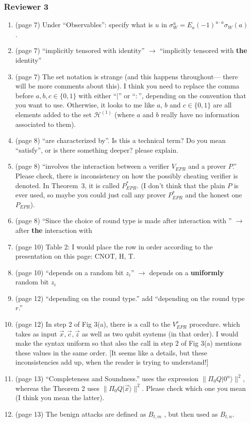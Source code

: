 \documentclass[12pt]{article}
\begin{document}
\subsubsection*{Reviewer 3}
\begin{enumerate}
\item (page 7) Under ``Observables'': specify what is $u$ in $\sigma_W^u = E_a(-1)^{u\cdot a} \sigma_W(a)$.
    \item (page 7) ``implicitly tensored with identity'' $\rightarrow$ ``implicitly tensored with \textbf{the} identity''
\item (page 7) The set notation is strange (and this happens throughout--- there will be more comments about this). I think you need to replace the comma before $a,b,c \in \{0,1\}$ with either ``$\mid$'' or ``$:$'', depending on the convention that you want to use.  Otherwise, it looks to me like $a$, $b$ and $c\in \{0,1\}$ are all elements added to the set $\mathcal{H}^{(1)}$ (where $a$ and $b$ really have no information associated to them).
\item (page 8) ``are characterized by''. Is this a technical term? Do you mean ``satisfy'', or is there something deeper? please explain.
    \item (page 8) ``involves the interaction between a verifier $V_{EPR}$ and a prover $P$.'' Please check, there is inconsistency on how the possibly cheating verifier is denoted. In Theorem~3, it is called $P_{EPR}^*$.  (I don't think that the plain $P$ is ever used, so maybe you could just call any prover $P^*_{EPR}$ and the honest one $P_{EPR}$).
        \item (page 8) ``Since the choice of round type is made after interaction with '' $\rightarrow$ after \textbf{the} interaction with
 \item (page 10) Table 2: I would place the row in order according to the presentation on this page: CNOT, H, T.
     \item (page 10) ``depends on a random bit $z_i$'' $\rightarrow$   depends on a \textbf{uniformly} random bit $z_i$
   \item (page 12) ``depending on the round type.'' add ``depending on the round type \textbf{$r$}.''
   \item (page 12) In step 2 of Fig 3(a), there is a call to the $V_{EPR}^r$ procedure. which takes as input $\overrightarrow{x}, \overrightarrow{c}, \overrightarrow{z}$ as well as two qubit systems (in that order). I would make the syntax uniform so that also the call in step 2 of Fig 3(a) mentions these values in the same order. [It seems like a details, but these inconsistencies add up, when the reader is trying to understand!]
       \item (page 13) ``Completeness and Soundness.'' uses the expression $\|\Pi_0Q|0^n\rangle\|^2$, whereas the Theorem 2 uses $\|\Pi_0Q|\overrightarrow{x}\rangle\|^2$. Please check which one you mean (I think you mean the latter).
       \item (page 13) The benign attacks are defined as $B_{t,m}$ , but then used as $B_{t,n}$.
   \end{enumerate}
\end{document}
